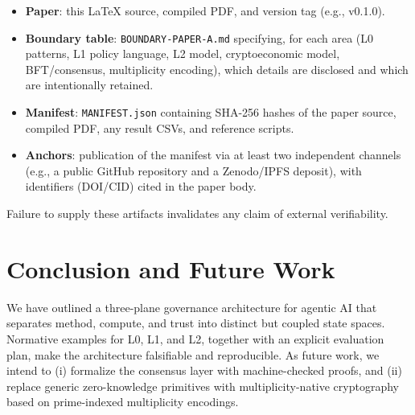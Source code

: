 \documentclass[11pt]{article}
\begin{document}
\begin{itemize}
  \item \textbf{Paper}: this LaTeX source, compiled PDF, and version tag (e.g., v0.1.0).
  \item \textbf{Boundary table}: \texttt{BOUNDARY-PAPER-A.md} specifying, for each area (L0 patterns, L1 policy language, L2 model, cryptoeconomic model, BFT/consensus, multiplicity encoding), which details are disclosed and which are intentionally retained.
  \item \textbf{Manifest}: \texttt{MANIFEST.json} containing SHA-256 hashes of the paper source, compiled PDF, any result CSVs, and reference scripts.
  \item \textbf{Anchors}: publication of the manifest via at least two independent channels (e.g., a public GitHub repository and a Zenodo/IPFS deposit), with identifiers (DOI/CID) cited in the paper body.
\end{itemize}

Failure to supply these artifacts invalidates any claim of external verifiability.

\section{Conclusion and Future Work}

We have outlined a three-plane governance architecture for agentic AI that separates method, compute, and trust into distinct but coupled state spaces. Normative examples for L0, L1, and L2, together with an explicit evaluation plan, make the architecture falsifiable and reproducible. As future work, we intend to (i) formalize the consensus layer with machine-checked proofs, and (ii) replace generic zero-knowledge primitives with multiplicity-native cryptography based on prime-indexed multiplicity encodings.
\end{document}
